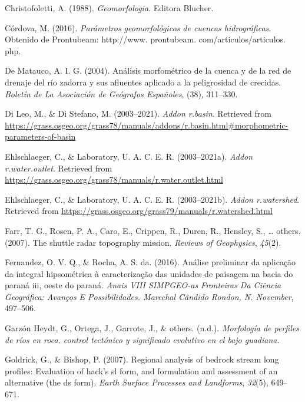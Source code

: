 \documentclass[11pt,]{article}
\begin{document}
\hypertarget{ref-christofoletti1988geomorfologia}{}
Christofoletti, A. (1988). \emph{Geomorfologia}. Editora Blucher.

\hypertarget{ref-cordova2016parametros}{}
Córdova, M. (2016). \emph{Parámetros geomorfológicos de cuencas
hidrográficas}. Obtenido de Prontubeam: http://www. prontubeam.
com/articulos/articulos. php.

\hypertarget{ref-de2004analisis}{}
De Matauco, A. I. G. (2004). Análisis morfométrico de la cuenca y de la
red de drenaje del río zadorra y sus afluentes aplicado a la
peligrosidad de crecidas. \emph{Boletín de La Asociación de Geógrafos
Españoles}, (38), 311--330.

\hypertarget{ref-basinmargherita}{}
Di Leo, M., \& Di Stefano, M. (2003--2021). \emph{Addon r.basin}.
Retrieved from
\url{https://grass.osgeo.org/grass78/manuals/addons/r.basin.html\#morphometric-parameters-of-basin}

\hypertarget{ref-wateroutlet}{}
Ehlschlaeger, C., \& Laboratory, U. A. C. E. R. (2003--2021a).
\emph{Addon r.water.outlet}. Retrieved from
\url{https://grass.osgeo.org/grass78/manuals/r.water.outlet.html}

\hypertarget{ref-watershedcharles}{}
Ehlschlaeger, C., \& Laboratory, U. A. C. E. R. (2003--2021b).
\emph{Addon r.watershed}. Retrieved from
\url{https://grass.osgeo.org/grass79/manuals/r.watershed.html}

\hypertarget{ref-farr2007shuttle}{}
Farr, T. G., Rosen, P. A., Caro, E., Crippen, R., Duren, R., Hensley,
S., \ldots{} others. (2007). The shuttle radar topography mission.
\emph{Reviews of Geophysics}, \emph{45}(2).

\hypertarget{ref-fernandez2016analise}{}
Fernandez, O. V. Q., \& Rocha, A. S. da. (2016). Análise preliminar da
aplicação da integral hipsométrica à caracterização das unidades de
paisagem na bacia do paraná iii, oeste do paraná. \emph{Anais VIII
SIMPGEO-as Fronteiras Da Ciência Geográfica: Avanços E Possibilidades.
Marechal Cândido Rondon, N. November}, 497--506.

\hypertarget{ref-garzonmorfologia}{}
Garzón Heydt, G., Ortega, J., Garrote, J., \& others. (n.d.).
\emph{Morfología de perfiles de ríos en roca. control tectónico y
significado evolutivo en el bajo guadiana}.

\hypertarget{ref-goldrick2007regional}{}
Goldrick, G., \& Bishop, P. (2007). Regional analysis of bedrock stream
long profiles: Evaluation of hack's sl form, and formulation and
assessment of an alternative (the ds form). \emph{Earth Surface
Processes and Landforms}, \emph{32}(5), 649--671.
\end{document}
